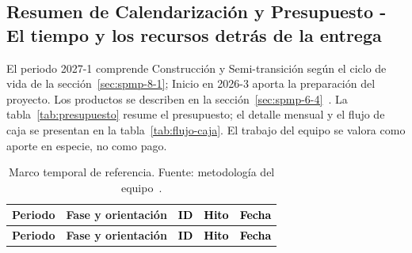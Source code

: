 \subsection{Resumen de Calendarización y Presupuesto - El tiempo y los recursos detrás de la entrega}\label{sec:spmp-6-5}
El periodo 2027-1 comprende Construcción y Semi-transición según el ciclo de vida de la sección~\ref{sec:spmp-8-1}; Inicio en 2026-3 aporta la preparación del proyecto. Los productos se describen en la sección~\ref{sec:spmp-6-4}~\cite{adaptacion2026}. La tabla~\ref{tab:presupuesto} resume el presupuesto; el detalle mensual y el flujo de caja se presentan en la tabla~\ref{tab:flujo-caja}. El trabajo del equipo se valora como aporte en especie, no como pago.

\begin{longtable}{|>{\raggedright\arraybackslash}p{0.13\dimexpr\linewidth-10\tabcolsep-6\arrayrulewidth\relax}|>{\raggedright\arraybackslash}p{0.23\dimexpr\linewidth-10\tabcolsep-6\arrayrulewidth\relax}|>{\raggedright\arraybackslash}p{0.06\dimexpr\linewidth-10\tabcolsep-6\arrayrulewidth\relax}|>{\raggedright\arraybackslash}p{0.44\dimexpr\linewidth-10\tabcolsep-6\arrayrulewidth\relax}|>{\raggedright\arraybackslash}p{0.14\dimexpr\linewidth-10\tabcolsep-6\arrayrulewidth\relax}|}
\caption{Marco temporal de referencia. Fuente: metodología del equipo~\cite{adaptacion2026}.}\label{tab:hitos}\\\hline
\textbf{Periodo} & \textbf{Fase y orientación} & \textbf{\textcolor{black}{ID}} & \textbf{\textcolor{black}{Hito}} & \textbf{\textcolor{black}{Fecha}}\\\hline
\endfirsthead\hline
\textbf{Periodo} & \textbf{Fase y orientación} & \textbf{\textcolor{black}{ID}} & \textbf{\textcolor{black}{Hito}} & \textbf{\textcolor{black}{Fecha}}\\\hline

\end{longtable}
